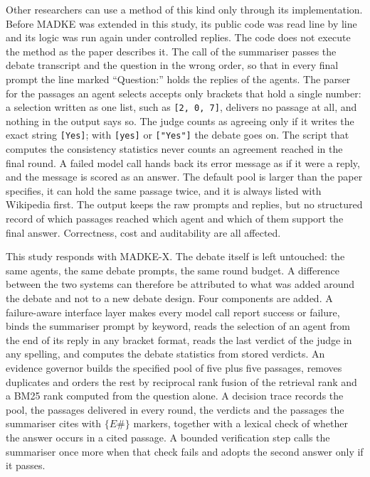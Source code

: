 Other researchers can use a method of this kind only through its implementation. Before MADKE was extended in this study, its public code \cite{madke2025code} was read line by line and its logic was run again under controlled replies. The code does not execute the method as the paper describes it. The call of the summariser passes the debate transcript and the question in the wrong order, so that in every final prompt the line marked ``Question:'' holds the replies of the agents. The parser for the passages an agent selects accepts only brackets that hold a single number: a selection written as one list, such as \texttt{[2, 0, 7]}, delivers no passage at all, and nothing in the output says so. The judge counts as agreeing only if it writes the exact string \texttt{[Yes]}; with \texttt{[yes]} or \texttt{["Yes"]} the debate goes on. The script that computes the consistency statistics never counts an agreement reached in the final round. A failed model call hands back its error message as if it were a reply, and the message is scored as an answer. The default pool is larger than the paper specifies, it can hold the same passage twice, and it is always listed with Wikipedia first. The output keeps the raw prompts and replies, but no structured record of which passages reached which agent and which of them support the final answer. Correctness, cost and auditability are all affected.

This study responds with MADKE-X. The debate itself is left untouched: the same agents, the same debate prompts, the same round budget. A difference between the two systems can therefore be attributed to what was added around the debate and not to a new debate design. Four components are added. A failure-aware interface layer makes every model call report success or failure, binds the summariser prompt by keyword, reads the selection of an agent from the end of its reply in any bracket format, reads the last verdict of the judge in any spelling, and computes the debate statistics from stored verdicts. An evidence governor builds the specified pool of five plus five passages, removes duplicates and orders the rest by reciprocal rank fusion \cite{cormack2009rrf} of the retrieval rank and a BM25 rank \cite{robertson2009bm25} computed from the question alone. A decision trace records the pool, the passages delivered in every round, the verdicts and the passages the summariser cites with $\{E\#\}$ markers, together with a lexical check of whether the answer occurs in a cited passage. A bounded verification step calls the summariser once more when that check fails and adopts the second answer only if it passes.

